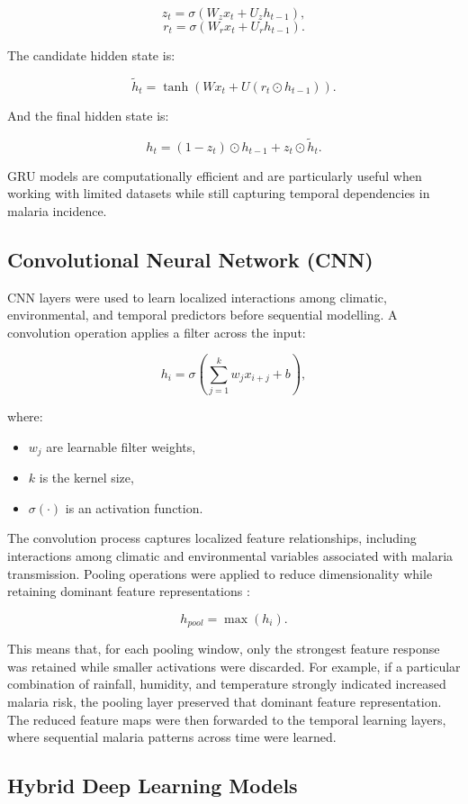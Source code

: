 \[
z_t = \sigma(W_z x_t + U_z h_{t-1}),
\]
\[
r_t = \sigma(W_r x_t + U_r h_{t-1}).
\]

The candidate hidden state is:

\[
\tilde{h}_t = \tanh(W x_t + U(r_t \odot h_{t-1})).
\]

And the final hidden state is:

\[
h_t = (1 - z_t) \odot h_{t-1} + z_t \odot \tilde{h}_t.
\]

GRU models are computationally efficient and are particularly useful when working with limited datasets while still capturing temporal dependencies in malaria incidence.


\subsection{Convolutional Neural Network (CNN)}

CNN layers were used to learn localized interactions among climatic, environmental, and temporal predictors before sequential modelling. A convolution operation applies a filter across the input:

\[
h_i = \sigma \left( \sum_{j=1}^{k} w_j x_{i+j} + b \right),
\]

where:
\begin{itemize}
	\item $w_j$ are learnable filter weights,
	\item $k$ is the kernel size,
	\item $\sigma(\cdot)$ is an activation function.
\end{itemize}

The convolution process captures localized feature relationships, including interactions among climatic and environmental variables associated with malaria transmission. Pooling operations were applied to reduce dimensionality while retaining dominant feature representations \cite{Ooko2024}:

\[
h_{pool} = \max(h_i).
\]

This means that, for each pooling window, only the strongest feature response was retained while smaller activations were discarded. For example, if a particular combination of rainfall, humidity, and temperature strongly indicated increased malaria risk, the pooling layer preserved that dominant feature representation. The reduced feature maps were then forwarded to the temporal learning layers, where sequential malaria patterns across time were learned.

\subsection{Hybrid Deep Learning Models}
\label{sec:hybrid_models}

